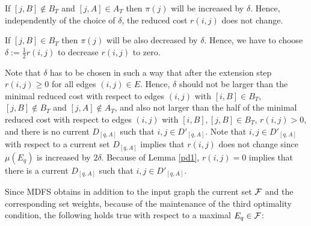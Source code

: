 \documentclass[12pt,twoside,a4paper]{article}
\begin{document}
If $[j,B] \not\in B_T$ and $[j,A] \in A_T$ then $\pi(j)$ will be increased by $\delta$.
Hence, independently of the choice of $\delta$, the reduced cost $r(i,j)$ does not change.

If $[j,B] \in B_T$ then $\pi(j)$ will be also decreased by $\delta$. Hence, we have to 
choose $\delta := \frac{1}{2}r(i,j)$ to decrease $r(i,j)$ to zero.

Note that $\delta$ has to be chosen in such a way that after the extension step
$r(i,j) \geq 0$ for all edges $(i,j) \in E$. Hence, $\delta$ should not be 
larger than the minimal reduced cost with respect to edges $(i,j)$ with
$[i,B] \in B_T$, $[j,B] \not\in B_T$ and $[j,A] \not\in A_T$, and also not larger than 
the half of the minimal reduced cost with respect to edges $(i,j)$ with 
$[i,B],[j,B] \in B_T$, $r(i,j) > 0$, and there is no current $D_{[q,A]}$ such that 
$i,j \in D'_{[q,A]}$. Note that $i,j \in D'_{[q,A]}$ with respect to a current set
$D_{[q,A]}$ implies that $r(i,j)$ does not change since $\mu(E_q)$ is increased by 
$2\delta$. Because of Lemma \ref{pd1}, $r(i,j) = 0$ implies that there is a current 
$D_{[q,A]}$ such that $i,j \in D'_{[q,A]}$.

Since MDFS obtains in addition to the input graph the current set $\cal F$ and the  
corresponding set weights, because of the maintenance of the third optimality 
condition, the following holds true with respect to a maximal $E_q \in \cal F$:
\end{document}
